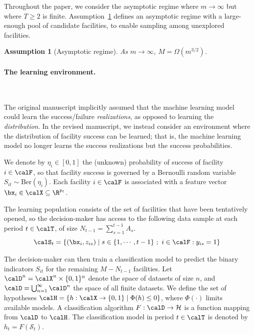 \documentclass[11pt]{article}
\newtheorem{assumption}{Assumption}[]
\begin{document}
Throughout the paper, we consider the asymptotic regime where $m\to\infty$ but where $T\geq2$ is finite. Assumption~\ref{ass:regime_R2} defines an asymptotic regime with a large-enough pool of candidate facilities, to enable sampling among unexplored facilities.
\setcounter{assumption}{0}
\begin{assumption}[Asymptotic regime]
    \label{ass:regime_R2}
   As $m \to \infty$, $M=\Omega(m^{3/2})$.
\end{assumption}

\paragraph{The learning environment.}\

The original manuscript implicitly assumed that the machine learning model could learn the success/failure \textit{realizations}, as opposed to learning the \textit{distribution}. In the revised manuscript, we instead consider an environment where the distribution of facility success can be learned; that is, the machine learning model no longer learns the success realizations but the success probabilities.

We denote by $\eta_{i} \in [0,1]$ the (unknown) probability of success of facility $i\in\calF$, so that facility success is governed by a Bernoulli random variable $S_{it}\sim \text{Ber}(\eta_{i})$. Each facility $i\in\calF$ is associated with a feature vector $\bx_{i} \in \calX\subseteq\R^{p_t}$.

The learning population consists of the set of facilities that have been tentatively opened, so the decision-maker has access to the following data sample at each period $t\in\calT$, of size $N_{t-1}=\sum_{s=1}^{t-1}A_s$.
$$\calS_t=\left\{(\bx_{i},z_{is})\mid s\in\{1,\cdots,t-1\}\ ;\ i\in\calF:y_{is}=1\right\}$$

The decision-maker can then train a classification model to predict the binary indicators $S_{it}$ for the remaining $M-N_{t-1}$ facilities. Let $\calD^n = \calX^n\times\{0,1\}^n$ denote the space of datasets of size $n$, and $\calD = \bigcup_{n=1}^\infty \calD^n$ the space of all finite datasets. We define the set of hypotheses $\calH = \{h: \calX \to \{0,1\} \mid \Phi(h) \leq 0\}$, where $\Phi(\cdot)$ limits available models. A classification algorithm $F: \calD \to \mathcal{H}$ is a function mapping from $ \calD$ to $\calH$. The classification model in period $t\in\calT$ is denoted by $h_t = F(\mathcal{S}_t)$.
\end{document}
